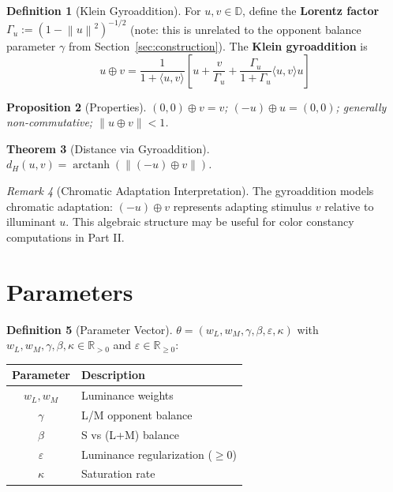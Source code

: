 \documentclass[11pt]{article}
\theoremstyle{plain}
\newtheorem{theorem}{Theorem}[section]
\newtheorem{proposition}[theorem]{Proposition}
\theoremstyle{definition}
\newtheorem{definition}[theorem]{Definition}
\theoremstyle{remark}
\newtheorem{remark}[theorem]{Remark}
\newcommand{\Rnn}{\mathbb{R}_{\geq 0}}  %
\newcommand{\Rpp}{\mathbb{R}_{> 0}}     %
\newcommand{\D}{\mathbb{D}}
\newcommand{\norm}[1]{\left\lVert #1 \right\rVert}
\newcommand{\inner}[2]{\langle #1, #2 \rangle}
\DeclareMathOperator{\arctanh}{arctanh}
\begin{document}
\begin{definition}[Klein Gyroaddition]
For $u, v \in \D$, define the \textbf{Lorentz factor} $\Gamma_u := (1 - \norm{u}^2)^{-1/2}$ (note: this is unrelated to the opponent balance parameter $\gamma$ from Section~\ref{sec:construction}). The \textbf{Klein gyroaddition} is
\begin{equation}
\boxed{
u \oplus v = \frac{1}{1 + \inner{u}{v}} \left[ u + \frac{v}{\Gamma_u} + \frac{\Gamma_u}{1 + \Gamma_u}\inner{u}{v} u \right]
}
\end{equation}
\end{definition}

\begin{proposition}[Properties]
$(0,0) \oplus v = v$; $(-u) \oplus u = (0,0)$; generally non-commutative; $\norm{u \oplus v} < 1$.
\end{proposition}

\begin{theorem}[Distance via Gyroaddition]
$d_H(u, v) = \arctanh(\norm{(-u) \oplus v})$.
\end{theorem}

\begin{remark}[Chromatic Adaptation Interpretation]
The gyroaddition models chromatic adaptation: $(-u) \oplus v$ represents adapting stimulus $v$ relative to illuminant $u$. This algebraic structure may be useful for color constancy computations in Part II.
\end{remark}

\section{Parameters}
\label{sec:parameters}

\begin{definition}[Parameter Vector]
$\theta = (w_L, w_M, \gamma, \beta, \varepsilon, \kappa)$ with $w_L, w_M, \gamma, \beta, \kappa \in \Rpp$ and $\varepsilon \in \Rnn$:
\begin{center}
\begin{tabular}{cl}
\toprule
Parameter & Description \\
\midrule
$w_L, w_M$ & Luminance weights \\
$\gamma$ & L/M opponent balance \\
$\beta$ & S vs (L+M) balance \\
$\varepsilon$ & Luminance regularization ($\geq 0$) \\
$\kappa$ & Saturation rate \\
\bottomrule
\end{tabular}
\end{center}
\end{definition}
\end{document}
